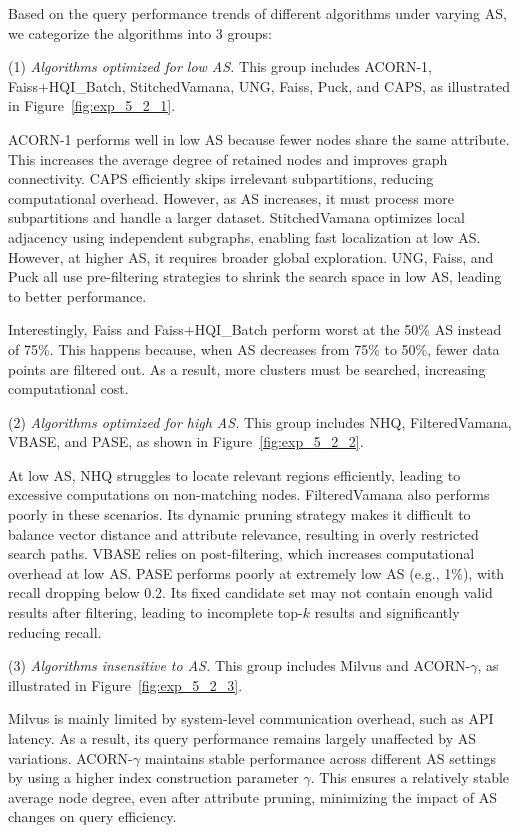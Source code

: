 \documentclass[sigconf, nonacm]{acmart}
\begin{document}
	
	Based on the query performance trends of different algorithms under varying AS, we categorize the algorithms into 3 groups:
	
	(1) \textit{Algorithms optimized for low AS.}  
	This group includes ACORN-1, Faiss+HQI\_Batch, StitchedVamana, UNG, Faiss, Puck, and CAPS, as illustrated in Figure~\ref{fig:exp_5_2_1}.
	
	ACORN-1 performs well in low AS because fewer nodes share the same attribute. This increases the average degree of retained nodes and improves graph connectivity. CAPS efficiently skips irrelevant subpartitions, reducing computational overhead. However, as AS increases, it must process more subpartitions and handle a larger dataset. StitchedVamana optimizes local adjacency using independent subgraphs, enabling fast localization at low AS. However, at higher AS, it requires broader global exploration. UNG, Faiss, and Puck all use pre-filtering strategies to shrink the search space in low AS, leading to better performance.
	
	Interestingly, Faiss and Faiss+HQI\_Batch perform worst at the 50\% AS instead of 75\%.
	This happens because, when AS decreases from 75\% to 50\%, fewer data points are filtered out. As a result, more clusters must be searched, increasing computational cost.
	
	\par
	(2) \textit{Algorithms optimized for high AS.}  
	This group includes NHQ, FilteredVamana, VBASE, and PASE, as shown in Figure~\ref{fig:exp_5_2_2}.
	
	At low AS, NHQ struggles to locate relevant regions efficiently, leading to excessive computations on non-matching nodes. FilteredVamana also performs poorly in these scenarios. Its dynamic pruning strategy makes it difficult to balance vector distance and attribute relevance, resulting in overly restricted search paths.
	VBASE relies on post-filtering, which increases computational overhead at low AS. PASE performs poorly at extremely low AS (e.g., 1\%), with recall dropping below 0.2. Its fixed candidate set may not contain enough valid results after filtering, leading to incomplete top-$k$ results and significantly reducing recall.
	
	\par
	(3) \textit{Algorithms insensitive to AS.}  
	This group includes Milvus and ACORN-\(\gamma\), as illustrated in Figure~\ref{fig:exp_5_2_3}.
	
	Milvus is mainly limited by system-level communication overhead, such as API latency. As a result, its query performance remains largely unaffected by AS variations. ACORN-\(\gamma\) maintains stable performance across different AS settings by using a higher index construction parameter $\gamma$. This ensures a relatively stable average node degree, even after attribute pruning, minimizing the impact of AS changes on query efficiency.
	
\end{document}
